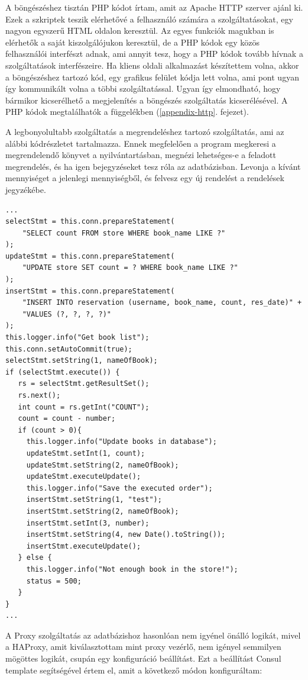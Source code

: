 \documentclass[11pt,magyar,a4paper,twoside,]{report}
\begin{document}
A böngészéshez tisztán PHP kódot írtam, amit az Apache HTTP szerver
ajánl ki. Ezek a szkriptek teszik elérhetővé a felhasználó számára a
szolgáltatásokat, egy nagyon egyszerű HTML oldalon keresztül. Az egyes
funkciók magukban is elérhetők a saját kiszolgálójukon keresztül, de a
PHP kódok egy közös felhasználói interfészt adnak, ami annyit tesz, hogy
a PHP kódok tovább hívnak a szolgáltatások interfészeire. Ha kliens
oldali alkalmazást készítettem volna, akkor a böngészéshez tartozó kód,
egy grafikus felület kódja lett volna, ami pont ugyan így kommunikált
volna a többi szolgáltatással. Ugyan így elmondható, hogy bármikor
kicserélhető a megjelenítés a böngészés szolgáltatás kicserélésével. A
PHP kódok megtalálhatók a függelékben (\ref{appendix-http}. fejezet).

A legbonyolultabb szolgáltatás a megrendeléshez tartozó szolgáltatás,
ami az alábbi kódrészletet tartalmazza. Ennek megfelelően a program
megkeresi a megrendelendő könyvet a nyilvántartásban, megnézi
lehetséges-e a feladott megrendelés, és ha igen bejegyzéseket tesz róla
az adatbázisban. Levonja a kívánt mennyiséget a jelenlegi mennyiségből,
és felvesz egy új rendelést a rendelések jegyzékébe.

\begin{verbatim}
...
selectStmt = this.conn.prepareStatement(
    "SELECT count FROM store WHERE book_name LIKE ?"
);
updateStmt = this.conn.prepareStatement(
    "UPDATE store SET count = ? WHERE book_name LIKE ?"
);
insertStmt = this.conn.prepareStatement(
    "INSERT INTO reservation (username, book_name, count, res_date)" +
    "VALUES (?, ?, ?, ?)"
);
this.logger.info("Get book list");
this.conn.setAutoCommit(true);
selectStmt.setString(1, nameOfBook);
if (selectStmt.execute()) {
   rs = selectStmt.getResultSet();
   rs.next();
   int count = rs.getInt("COUNT");
   count = count - number;
   if (count > 0){
     this.logger.info("Update books in database");
     updateStmt.setInt(1, count);
     updateStmt.setString(2, nameOfBook);
     updateStmt.executeUpdate();
     this.logger.info("Save the executed order");
     insertStmt.setString(1, "test");
     insertStmt.setString(2, nameOfBook);
     insertStmt.setInt(3, number);
     insertStmt.setString(4, new Date().toString());
     insertStmt.executeUpdate();
   } else {
     this.logger.info("Not enough book in the store!");
     status = 500;     
   }
}
...
\end{verbatim}

A Proxy szolgáltatás az adatbázishoz hasonlóan nem igyénel önálló
logikát, mivel a HAProxy, amit kiválasztottam mint proxy vezérlő, nem
igényel semmilyen mögöttes logikát, csupán egy konfiguráció beállítást.
Ezt a beállítást Consul template segítségével értem el, amit a következő
módon konfiguráltam:
\end{document}
